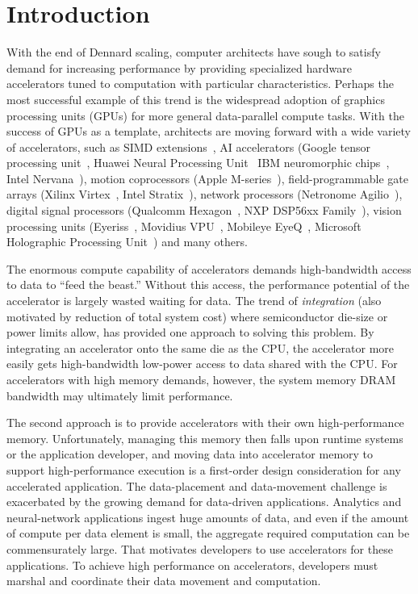 \chapter{Introduction}
\label{ch:introduction}

With the end of Dennard scaling, computer architects have sough to satisfy demand for increasing performance by providing specialized hardware accelerators tuned to computation with particular characteristics.
Perhaps the most successful example of this trend is the widespread adoption of graphics processing units (GPUs) for more general data-parallel compute tasks.
With the success of GPUs as a template, architects are moving forward with a wide variety of accelerators, such as
SIMD extensions~\cite{intel2017avx, matz2013sse, arm2017neon},
AI accelerators (Google tensor processing unit~\cite{jouppi2017datacenter}, Huawei Neural Processing Unit~\cite{huawei2017kirin} IBM neuromorphic chips~\cite{merolla2014million}, Intel Nervana~\cite{intel2017nervana}),
motion coprocessors (Apple M-series~\cite{kandangath2015coremotion}),
field-programmable gate arrays (Xilinx Virtex~\cite{xilinx2018virtex}, Intel Stratix~\cite{intel2018stratix}), 
network processors (Netronome Agilio~\cite{netronome2018agilio}),
digital signal processors (Qualcomm Hexagon~\cite{codrescu2013hexagon}, NXP DSP56xx Family~\cite{nxp2018dsp}),
vision processing units (Eyeriss~\cite{chen2017eyeriss}, Movidius VPU~\cite{movidius2018vpu}, Mobileye EyeQ~\cite{mobileye2018eyeq}, Microsoft Holographic Processing Unit~\cite{microsoft2018hpu})
and many others.

The enormous compute capability of accelerators demands high-bandwidth access to data to ``feed the beast.''
Without this access, the performance potential of the accelerator is largely wasted waiting for data.
The trend of \textit{integration} (also motivated by reduction of total system cost) where semiconductor die-size or power limits allow, has provided one approach to solving this problem.
By integrating an accelerator onto the same die as the CPU, the accelerator more easily gets high-bandwidth low-power access to data shared with the CPU.
For accelerators with high memory demands, however, the system memory DRAM bandwidth may ultimately limit performance.

The second approach is to provide accelerators with their own high-performance memory.
Unfortunately, managing this memory then falls upon runtime systems or the application developer, and moving data into accelerator memory to support high-performance execution is a first-order design consideration for any accelerated application.
The data-placement and data-movement challenge is exacerbated by the growing demand for data-driven applications.
Analytics and neural-network applications ingest huge amounts of data, and even if the amount of compute per data element is small, the aggregate required computation can be commensurately large.
That motivates developers to use accelerators for these applications.
To achieve high performance on accelerators, developers must marshal and coordinate their data movement and computation.

